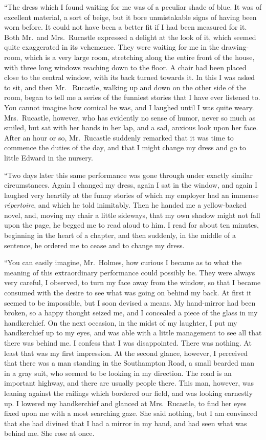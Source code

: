 “The dress which I found waiting for me was of a peculiar
shade of blue. It was of excellent material, a sort of beige,
but it bore unmistakable signs of having been worn before.
It could not have been a better fit if I had been measured for
it. Both Mr.~and Mrs.~Rucastle expressed a delight at the
look of it, which seemed quite exaggerated in its vehemence.
They were waiting for me in the drawing-room, which is a
very large room, stretching along the entire front of the house,
with three long windows reaching down to the floor. A chair
had been placed close to the central window, with its back
turned towards it. In this I was asked to sit, and then Mr.\ %
Rucastle, walking up and down on the other side of the room,
began to tell me a series of the funniest stories that I have
ever listened to. You cannot imagine how comical he was,
and I laughed until I was quite weary. Mrs.~Rucastle, however,
who has evidently no sense of humor, never so much as
smiled, but sat with her hands in her lap, and a sad, anxious
look upon her face. After an hour or so, Mr.~Rucastle suddenly
remarked that it was time to commence the duties of
the day, and that I might change my dress and go to little
Edward in the nursery.

“Two days later this same performance was gone through
under exactly similar circumstances. Again I changed my
dress, again I sat in the window, and again I laughed very
heartily at the funny stories of which my employer had an
immense \textit{répertoire}, and which he told inimitably. Then he
handed me a yellow-backed novel, and, moving my chair a little
sideways, that my own shadow might not fall upon the page,
he begged me to read aloud to him. I read for about ten
minutes, beginning in the heart of a chapter, and then suddenly,
in the middle of a sentence, he ordered me to cease
and to change my dress.

“You can easily imagine, Mr.~Holmes, how curious I became
as to what the meaning of this extraordinary performance
could possibly be. They were always very careful, I
observed, to turn my face away from the window, so that I
became consumed with the desire to see what was going on
behind my back. At first it seemed to be impossible, but I
soon devised a means. My hand-mirror had been broken, so a
happy thought seized me, and I concealed a piece of the glass
in my handkerchief. On the next occasion, in the midst of
my laughter, I put my handkerchief up to my eyes, and was
able with a little management to see all that there was behind
me. I confess that I was disappointed. There was
nothing. At least that was my first impression. At the second
glance, however, I perceived that there was a man standing
in the Southampton Road, a small bearded man in a gray
suit, who seemed to be looking in my direction. The road is
an important highway, and there are usually people there.
This man, however, was leaning against the railings which
bordered our field, and was looking earnestly up. I lowered
my handkerchief and glanced at Mrs.~Rucastle, to find her
eyes fixed upon me with a most searching gaze. She said
nothing, but I am convinced that she had divined that I had
a mirror in my hand, and had seen what was behind me. She
rose at once.

